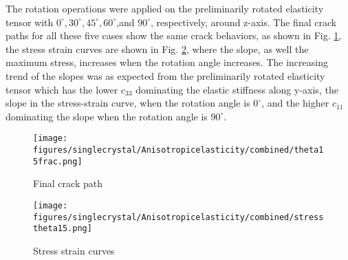 \documentclass[3p,10pt,sort&compress]{elsarticle}
\begin{document}
The rotation operations were applied on the preliminarily rotated elasticity tensor with $0^{\circ},30^{\circ},45^{\circ},60^{\circ}$,and  $90^{\circ}$, respectively, around z-axis. The final crack paths for all these five cases show the same crack behaviors, as shown in Fig. \ref{fig:crackpathbothaniso}, the stress strain curves are shown in Fig. \ref{fig:stressbothaniso}, where the slope, as well the maximum stress, increases when the rotation angle increases. The increasing trend of the slopes was as expected from the preliminarily rotated elasticity tensor which has the lower $c_{33}$ dominating the elastic stiffness along y-axis, the slope in the stress-strain curve, when the rotation angle is $0^{\circ}$, and the higher $c_{11}$ dominating the slope when the rotation angle is $90^{\circ}$.
\begin{figure*}[!htb]
	\centering
  \begin{subfigure}{0.45\textwidth}
		\texttt{[image: figures/singlecrystal/Anisotropicelasticity/combined/theta15frac.png]}
		\caption{Final crack path}
	  \label{fig:crackpathbothaniso}
	\end{subfigure}
	\begin{subfigure}{0.45\textwidth}
		\texttt{[image: figures/singlecrystal/Anisotropicelasticity/combined/stresstheta15.png]}
		\caption{Stress strain curves}
	  \label{fig:stressbothaniso}
	\end{subfigure}
	\caption{Crack behaviors of Mode I fracture simulation by including both anisotropic elasticity and anisotropic fracture energy, with $\delta=0.4,j=2,\theta_0=15^{\circ}$, the elasticity rotation are ranging from $0^{\circ}$ - $90^{\circ}$, the final crack paths were all the same as shown in Fig. \ref{fig:crackpathbothaniso}, the stress strain curves with different crystal orientations are shown in Fig. \ref{fig:stressbothaniso}}
\end{figure*}
\end{document}

